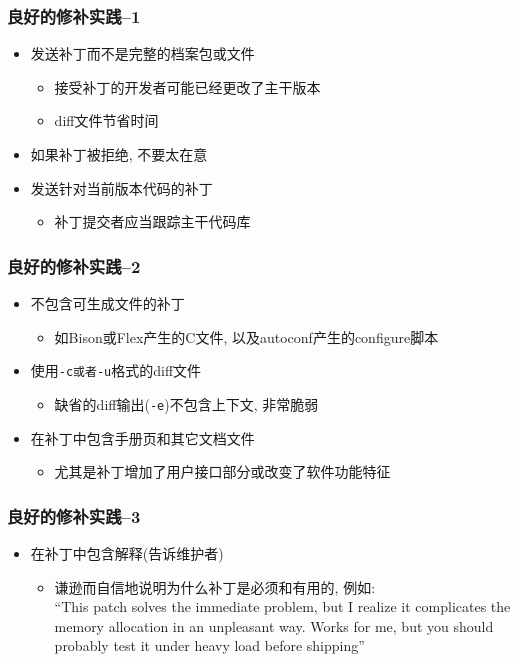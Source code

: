 \documentclass[compress]{beamer}
\begin{document}
\begin{frame}
\frametitle{良好的修补实践--1}
\begin{itemize}
\item 发送补丁而不是完整的档案包或文件
    \begin{itemize}
    \item 接受补丁的开发者可能已经更改了主干版本
    \item diff文件节省时间
    \end{itemize}
\item 如果补丁被拒绝, 不要太在意
\item 发送针对当前版本代码的补丁
    \begin{itemize}
    \item 补丁提交者应当跟踪主干代码库
    \end{itemize}

\end{itemize}

\end{frame}

\begin{frame}[fragile]
\frametitle{良好的修补实践--2}
\begin{itemize}
\item 不包含可生成文件的补丁
    \begin{itemize}
    \item 如Bison或Flex产生的C文件, 以及autoconf产生的configure脚本
    \end{itemize}
\item 使用\verb~-c或者-u~格式的diff文件
    \begin{itemize}
    \item 缺省的diff输出(\verb~-e~)不包含上下文, 非常脆弱
    \end{itemize}

\item 在补丁中包含手册页和其它文档文件
    \begin{itemize}
    \item 尤其是补丁增加了用户接口部分或改变了软件功能特征
    \end{itemize}
\end{itemize}


\end{frame}

\begin{frame}
\frametitle{良好的修补实践--3}
\begin{itemize}
\item 在补丁中包含解释(告诉维护者)
    \begin{itemize}
    \item 谦逊而自信地说明为什么补丁是必须和有用的, 例如:\\
    ``This patch solves the immediate problem,
    but I realize it complicates the memory allocation in an unpleasant way.
    Works for me, but you should probably test it under heavy load before shipping''
    \end{itemize}

\end{itemize}


\end{frame}
\end{document}
